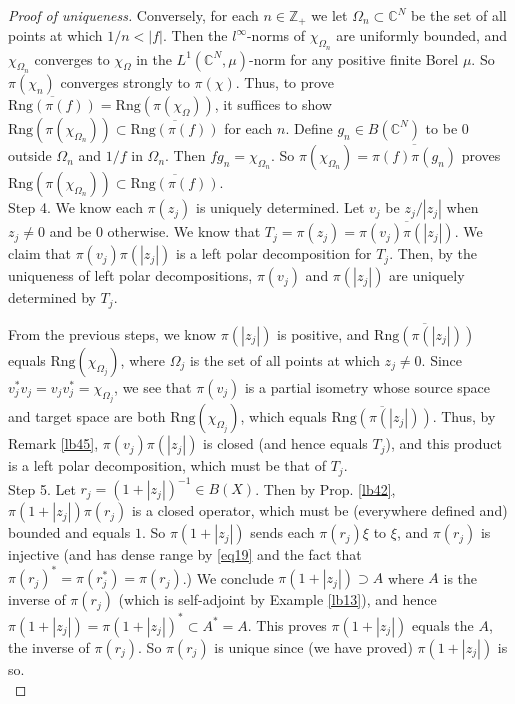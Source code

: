 \documentclass[12pt,b5paper,notitlepage]{article}
\theoremstyle{definition}
\theoremstyle{plain}
\newcommand{\ovl}{\overline}
\newcommand{\Cbb}{\mathbb C}
\newcommand{\Zbb}{\mathbb Z}
\newcommand{\Rng}{\mathrm{Rng}}
\numberwithin{equation}{section}
\begin{document}
\begin{proof}[Proof of uniqueness]
Conversely, for each $n\in\Zbb_+$ we let $\Omega_n\subset\Cbb^N$ be the set of all points at which $1/n<|f|$. Then the $l^\infty$-norms  of $\chi_{\Omega_n}$ are uniformly bounded, and $\chi_{\Omega_n}$ converges to $\chi_\Omega$ in the $L^1(\Cbb^N,\mu)$-norm for any positive finite Borel $\mu$. So $\pi(\chi_n)$ converges strongly to $\pi(\chi)$. Thus, to prove   $\ovl{\Rng(\pi(f))}=\Rng(\pi(\chi_\Omega))$, it suffices to show $\Rng(\pi(\chi_{\Omega_n}))\subset\ovl{\Rng(\pi(f))}$ for each $n$. Define $g_n\in B(\Cbb^N)$ to be $0$ outside $\Omega_n$ and $1/f$ in $\Omega_n$. Then $fg_n=\chi_{\Omega_n}$. So $\pi(\chi_{\Omega_n})=\ovl{\pi(f)\pi(g_n)}$ proves $\Rng(\pi(\chi_{\Omega_n}))\subset\ovl{\Rng(\pi(f))}$.\\[-1ex]
	
Step 4. We know each $\pi(z_j)$ is uniquely determined. Let $v_j$ be $z_j/|z_j|$ when $z_j\neq 0$ and be $0$ otherwise. We know that $T_j=\pi(z_j)=\ovl{\pi(v_j)\pi(|z_j|)}$. We claim that $\pi(v_j)\pi(|z_j|)$ is a left polar decomposition for $T_j$. Then, by the uniqueness of left polar decompositions, $\pi(v_j)$ and $\pi(|z_j|)$ are uniquely determined by $T_j$. 

From the previous steps, we know $\pi(|z_j|)$ is positive, and $\ovl{\Rng(\pi(|z_j|))}$ equals $\Rng(\chi_{\Omega_j})$, where $\Omega_j$ is the set of all points at which $z_j\neq 0$. Since $v_j^*v_j=v_jv_j^*=\chi_{\Omega_j}$, we see that $\pi(v_j)$ is a partial isometry whose source space and target space are both $\Rng(\chi_{\Omega_j})$, which equals $\ovl{\Rng(\pi(|z_j|))}$. Thus, by Remark \ref{lb45}, $\pi(v_j)\pi(|z_j|)$ is closed (and hence equals $T_j$), and this product is a left polar decomposition, which must be that of $T_j$.\\[-1ex]

Step 5. Let $r_j=(1+|z_j|)^{-1}\in B(X)$. Then by Prop. \ref{lb42},  $\pi(1+|z_j|)\pi(r_j)$ is a closed operator, which must be (everywhere defined and) bounded and equals $1$. So $\pi(1+|z_j|)$ sends each $\pi(r_j)\xi$ to $\xi$, and $\pi(r_j)$ is injective (and has dense range by \eqref{eq19} and the fact that $\pi(r_j)^*=\pi(r_j^*)=\pi(r_j)$.) We conclude $\pi(1+|z_j|)\supset A$ where $A$ is the inverse of $\pi(r_j)$ (which is self-adjoint by Example \ref{lb13}), and hence $\pi(1+|z_j|)=\pi(1+|z_j|)^*\subset A^*=A$. This proves $\pi(1+|z_j|)$ equals the $A$, the inverse  of $\pi(r_j)$. So $\pi(r_j)$ is unique since (we have proved) $\pi(1+|z_j|)$ is so.\\[-1ex]




\end{proof}
\end{document}
